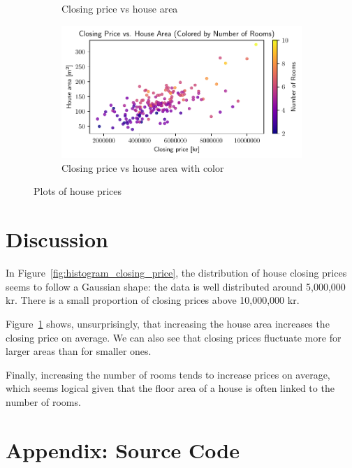 \documentclass[a4paper]{article}
\begin{document}
\begin{figure}
\begin{subfigure}[b]{\textwidth}
      \caption{Closing price vs house area}
      \label{fig:closing_price_house_ares}
  \end{subfigure}
  \vfill
  \begin{subfigure}[c]{\textwidth}
      \centering
      \includegraphics[width=\textwidth]{closing_price_house_ares_color.pdf}
      \caption{Closing price vs house area with color}
      \label{fig:closing_price_house_ares_color}
  \end{subfigure}
     \caption{Plots of house prices}
     \label{fig:house_plots}
\end{figure}


\newpage

\section*{Discussion}

In Figure~\ref{fig:histogram_closing_price}, the distribution of house closing prices seems to follow a Gaussian shape: the data is well distributed around 5,000,000 kr.
There is a small proportion of closing prices above 10,000,000 kr.

Figure~\ref{fig:closing_price_house_ares} shows, unsurprisingly, that increasing the house area increases the closing price on average.
We can also see that closing prices fluctuate more for larger areas than for smaller ones.

Finally, increasing the number of rooms tends to increase prices on average, which seems logical given that the floor area of a house is often linked to the number of rooms.

\newpage


\printbibliography

\section*{Appendix: Source Code}




\end{document}
